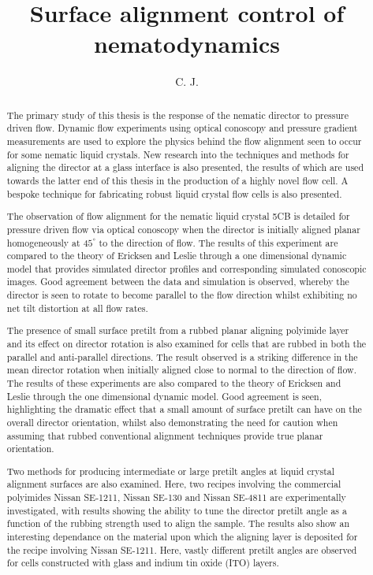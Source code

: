 \documentclass[prb, reprint, superscriptaddress, eqsecnum]{revtex4-1}
\begin{document}
\title{Surface alignment control of nematodynamics}
\author{C. J. }

\begin{abstract}
The primary study of this thesis is the response of the nematic director to pressure driven flow. Dynamic flow experiments using optical conoscopy and pressure gradient measurements are used to explore the physics behind the flow alignment seen to occur for some nematic liquid crystals. New research into the techniques and methods for aligning the director at a glass interface is also presented, the results of which are used towards the latter end of this thesis in the production of a highly novel flow cell. A bespoke technique for fabricating robust liquid crystal flow cells is also presented.

The observation of flow alignment for the nematic liquid crystal 5CB is detailed for pressure driven flow via optical conoscopy when the director is initially aligned planar homogeneously at $45^{\circ}$ to the direction of flow. The results of this experiment are compared to the theory of Ericksen and Leslie through a one dimensional dynamic model that provides simulated director profiles and corresponding simulated conoscopic images. Good agreement between the data and simulation is observed, whereby the director is seen to rotate to become parallel to the flow direction whilst exhibiting no net tilt distortion at all flow rates.

The presence of small surface pretilt from a rubbed planar aligning polyimide layer and its effect on director rotation is also examined for cells that are rubbed in both the parallel and anti-parallel directions. The result observed is a striking difference in the mean director rotation when initially aligned close to normal to the direction of flow. The results of these experiments are also compared to the theory of Ericksen and Leslie through the one dimensional dynamic model. Good agreement is seen, highlighting the dramatic effect that a small amount of surface pretilt can have on the overall director orientation, whilst also demonstrating the need for caution when assuming that rubbed conventional alignment techniques provide true planar orientation.

Two methods for producing intermediate or large pretilt angles at liquid crystal alignment surfaces are also examined. Here, two recipes involving the commercial polyimides Nissan SE-1211, Nissan SE-130 and Nissan SE-4811 are experimentally investigated, with results showing the ability to tune the director pretilt angle as a function of the rubbing strength used to align the sample. The results also show an interesting dependance on the material upon which the aligning layer is deposited for the recipe involving Nissan SE-1211. Here, vastly different pretilt angles are observed for cells constructed with glass and indium tin oxide (ITO) layers.


\end{abstract}
\end{document}
